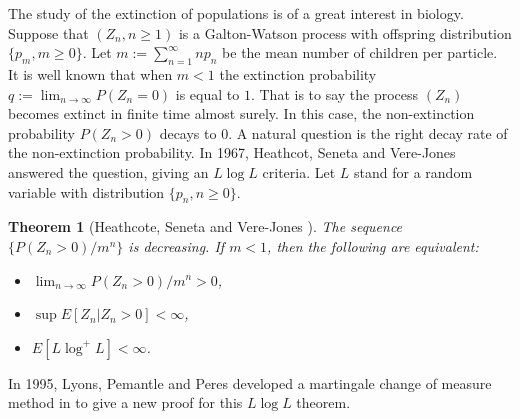 \documentclass[12pt,a4paper]{amsart}
\numberwithin{equation}{section}
\theoremstyle{plain}
\newtheorem{thm}{Theorem}[section]
\theoremstyle{definition}
\theoremstyle{remark}
\begin{document}
The study of the extinction of populations is of a great interest in biology. Suppose that $(Z_n, n\ge 1)$ is a Galton-Watson process
with offspring distribution $\{p_m, m\ge 0\}$.
Let $m:=\sum^{\infty}_{n=1}np_n$ be the mean number of
children per particle. It is well known that when $m<1$ the extinction probability $q:=\lim_{n\rightarrow\infty}P\left(Z_n=0\right)$ is equal to
$1$. That is to say the process $(Z_n)$ becomes extinct in finite time almost surely. In this case, the non-extinction probability $P(Z_n>0)$ decays to $0$.  A natural question is  the right decay rate of the non-extinction probability. In 1967, Heathcot, Seneta and Vere-Jones \cite{HeathcoteSenetaVere-Jones1967A-refinement} answered the question, giving an $L\log L$ criteria. Let $L$ stand for a random variable with distribution 
$\{p_n, n\ge 0\}$.

\begin{thm}[Heathcote, Seneta and Vere-Jones \cite{HeathcoteSenetaVere-Jones1967A-refinement}]
The sequence $\{ P(Z_n>0)/m^n\}$ is decreasing. If $m<1$, then the following are equivalent:
\begin{itemize}
\item[$(i)$] $\lim_{n\rightarrow\infty}P(Z_n>0)/m^n>0$,
\item[$(ii)$] $\sup E[Z_n|Z_n>0]<\infty$,
\item[$(iii)$] $E\left[L\log^+ L\right]<\infty$.
\end{itemize}
\end{thm}
In 1995, Lyons, Pemantle and Peres developed a martingale change of measure method in \cite{LyonsPemantlePeres1995Conceptual} to give a new proof for this $L\log L$ theorem.
\end{document}
